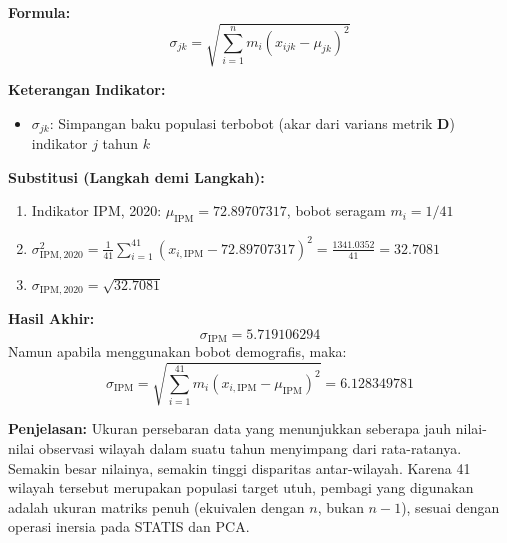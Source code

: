 \documentclass[11pt,a4paper]{article}
\begin{document}
\begin{tcolorbox}[formula_box, title={Simpangan Baku Populasi Terbobot ($\sigma$)}] \label{kotak:simpangan_baku}
\textbf{Formula:}
\[ \sigma_{jk} = \sqrt{\sum_{i=1}^{n} m_i (x_{ijk} - \mu_{jk})^2} \]

\textbf{Keterangan Indikator:}
\begin{itemize}
  \item $\sigma_{jk}$: Simpangan baku populasi terbobot (akar dari varians metrik $\mathbf{D}$) indikator $j$ tahun $k$
\end{itemize}

\textbf{Substitusi (Langkah demi Langkah):}
\begin{enumerate}
  \item Indikator IPM, 2020: $\mu_{\text{IPM}} = 72.89707317$, bobot seragam $m_i = 1/41$
  \item $\sigma_{\text{IPM},2020}^2 = \frac{1}{41} \sum_{i=1}^{41} (x_{i,\text{IPM}} - 72.89707317)^2 = \frac{1341.0352}{41} = 32.7081$
  \item $\sigma_{\text{IPM},2020} = \sqrt{32.7081}$
\end{enumerate}

\textbf{Hasil Akhir:}
\[ \sigma_{\text{IPM}} = 5.719106294 \]
Namun apabila menggunakan bobot demografis, maka:
\[ \sigma_{\text{IPM}} = \sqrt{\sum_{i=1}^{41} m_i (x_{i,\text{IPM}} - \mu_{\text{IPM}})^2} = 6.128349781 \]

\textbf{Penjelasan:} Ukuran persebaran data yang menunjukkan seberapa jauh nilai-nilai observasi wilayah dalam suatu tahun menyimpang dari rata-ratanya. Semakin besar nilainya, semakin tinggi disparitas antar-wilayah. Karena 41 wilayah tersebut merupakan populasi target utuh, pembagi yang digunakan adalah ukuran matriks penuh (ekuivalen dengan $n$, bukan $n-1$), sesuai dengan operasi inersia pada STATIS dan PCA.
\end{tcolorbox}
\end{document}
